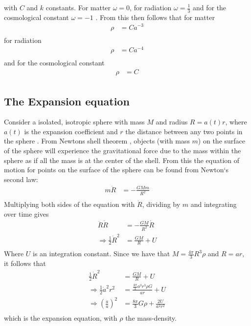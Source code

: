 \documentclass[a4paper, 11pt]{FSKH_623_Report}
\numberwithin{equation}{section}
\begin{document}
with $C$ and $k$ constants.
For matter $\omega=0$, for radiation $\omega=\frac{1}{3}$ and for the cosmological constant $\omega=-1$ \citep{notes4}. From this then follows that for matter 
\begin{equation}
\begin{split}
\rho &= Ca^{-3}\\
\end{split}
\end{equation}
for radiation
\begin{equation}
\begin{split}
\rho &= Ca^{-4}\\
\end{split}
\end{equation}
and for the cosmological constant
\begin{equation}
\begin{split}
\rho &= C\\
\end{split}
\end{equation}


\subsection*{The Expansion equation}
Consider a isolated, isotropic sphere with mass $M$ and radius $R=a(t)r$, where $a(t)$ is the expansion coefficient and $r$ the distance between any two points in the sphere \citep{notes4}. From Newtons shell theorem \citep{IronShell}, objects (with mass $m$) on the surface of the sphere will experience the gravitational force due to the mass within the sphere as if all the mass is at the center of the shell. From this the equation of motion for points on the surface of the sphere can be found from Newton`s second law:
\begin{equation}
\begin{split}
m\ddot{R} &= -\frac{GMm}{R^{2}}\\
\end{split}
\end{equation}
Multiplying both sides of the equation with $\dot{R}$, dividing by $m$ and integrating over time gives
\begin{equation}
\begin{split}
\ddot{R}\dot{R} &= -\frac{GM}{R^{2}}\dot{R}\\
\Rightarrow\frac{1}{2}\dot{R}^2 &= \frac{GM}{R}+U\\
\end{split}
\end{equation}
Where $U$ is an integration constant. Since we have that $M=\frac{4\pi}{3}R^{3}\rho$ and $R=ar$, it follows that
\begin{equation}
\begin{split}
\frac{1}{2}\dot{R}^2 &= \frac{GM}{R}+U\\
\Rightarrow\frac{1}{2}\dot{a}^{2}r^{2} &= \frac{\frac{4\pi}{3}a^{3}r^{3}\rho G}{ar}+U\\
\Rightarrow\left(\frac{\dot{a}}{a}\right)^{2} &= \frac{8\pi}{3}G\rho+\frac{2U}{a^{2}r^{2}}\\
\end{split}
\end{equation}
which is the expansion equation, with $\rho$ the mass-density.
\pagebreak
\end{document}
